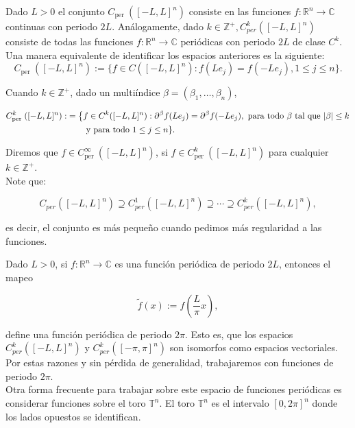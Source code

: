 \documentclass[12pt]{article}
\begin{document}
\begin{note}
    Dado $L>0$ el conjunto $C_{\text {per }}([-L, L]^n)$ consiste en las funciones $f: \mathbb{R}^n \rightarrow \mathbb{C}$ continuas con periodo $2L$. Análogamente, dado $k \in \mathbb{Z}^{+}, C_{p e r}^k([-L, L]^n)$ consiste de todas las funciones $f: \mathbb{R}^n \rightarrow \mathbb{C}$ periódicas con periodo $2 L$ de clase $C^k$.\\

Una manera equivalente de identificar los espacios anteriores es la siguiente:
$$
C_{\text {per }}([-L, L]^n):=\{f \in C([-L, L]^n): f(Le_j)=f(-Le_j), 1\leq j\leq n\}.
$$


Cuando $k \in \mathbb{Z}^{+}$, dado un multiíndice $\beta=(\beta_1,\ldots,\beta_n)$,

\begin{align*}
    C_{\text {per }}^k([-L, L]^n):&=\left\{f \in C^k([-L, L]^n): \partial^{\beta}f(Le_j)=\partial^{\beta}f(-Le_j), \text{ para todo } \beta \text{ tal que } |\beta|\leq k\right. \\
    &\hspace{0.8cm} \text{y para todo } 1\leq j\leq n\}.
\end{align*}

Diremos que $f \in C_{\text {per }}^{\infty}([-L, L]^n)$, si $f \in C_{\text {per }}^k([-L, L]^n)$ para cualquier $k \in \mathbb{Z}^{+}$.\\

Note que:

$$
C_{p e r}([-L, L]^n) \supseteq C_{p e r}^1([-L, L]^n) \supseteq \cdots \supseteq C_{p e r}^k([-L, L]^n),
$$

es decir, el conjunto es más pequeño cuando pedimos más regularidad a las funciones.

\end{note}

Dado $L>0$, si $f: \mathbb{R}^n \rightarrow \mathbb{C}$ es una función periódica de periodo $2 L$, entonces el mapeo

$$
\widetilde{f}(x):=f\left(\frac{L}{\pi} x\right),
$$

define una función periódica de periodo $2 \pi$. Esto es, que los espacios $C_{p e r}^k([-L, L]^n)$ y $C_{p e r}^k([-\pi, \pi]^n)$ son isomorfos como espacios vectoriales. Por estas razones y sin pérdida de generalidad, trabajaremos con funciones de periodo $2\pi$.\\

Otra forma frecuente para trabajar sobre este espacio de funciones periódicas es considerar funciones sobre  el toro $\mathbb{T}^n$. El toro $\mathbb{T}^n$ es el intervalo $[0,2 \pi]^n$ donde los lados opuestos se identifican.\\
\end{document}
